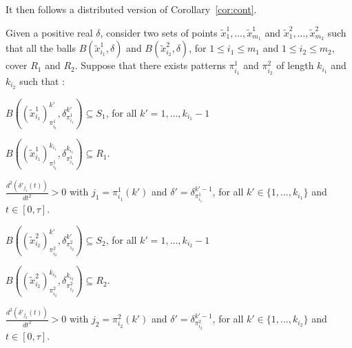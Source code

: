 It then follows a distributed version of Corollary~\ref{cor:cont}.
 \begin{corollary}\label{cor:cont_dist}
Given a positive real $\delta$, consider two sets of points
$\tilde x^1_{1},\dots,\tilde x^1_{m_1}$ and
$\tilde x^2_{1},\dots,\tilde x^2_{m_2}$ such that all the balls
$B(\tilde x^1_{i_1},\delta)$ and $B(\tilde x^2_{i_2},\delta)$, for $1 \leq i_1 \leq m_1$
and $1 \leq i_2 \leq m_2$,
cover $R_1$ and $R_2$.
Suppose that there exists patterns $\pi^1_{i_1}$ and $\pi^2_{i_2}$
of length $k_{i_1}$ and $k_{i_2}$
such that :

\begin{enumerate}
\item $B((\tilde{x}^1_{i_1})_{\pi^1_{i_1}}^{k'},\delta_{\pi^1_{i_1}}^{k'}) \subseteq S_1$,
for all $k'=1,\dots,k_{i_1}-1$
%
\item
$B((\tilde{x}^1_{i_1})_{\pi^1_{i_1}}^{k_{i_1}}, \delta_{\pi^1_{i_1}}^{k_{i_1}}) \subseteq R_1.$
%
{
\item $\frac{d^2(\delta'_{j_1}(t))}{dt^2}>0$
with $j_1=\pi_{i_1}^1(k')$ and $\delta'=\delta_{\pi_{i_1}^1}^{k'-1}$, for all
$k'\in\{1,...,k_{i_1}\}$ and $t\in [0,\tau]$.}
\end{enumerate}


\begin{enumerate}
\item $B((\tilde{x}^2_{i_2})_{\pi^2_{i_2}}^{k'},\delta_{\pi^2_{i_2}}^{k'}) \subseteq S_2$,
for all $k'=1,\dots,k_{i_2}-1$
%
\item
$B((\tilde{x}^2_{i_2})_{\pi^2_{i_2}}^{k_{i_2}}, \delta_{\pi^2_{i_2}}^{k_{i_2}}) \subseteq R_2.$
%
{
\item $\frac{d^2(\delta'_{j_2}(t))}{dt^2}>0$
with $j_2=\pi_{i_2}^2(k')$ and $\delta'=\delta_{\pi_{i_2}^2}^{k'-1}$, for all
$k'\in\{1,...,k_{i_2} \}$ and $t\in [0,\tau]$.}
\end{enumerate}


\end{corollary}
